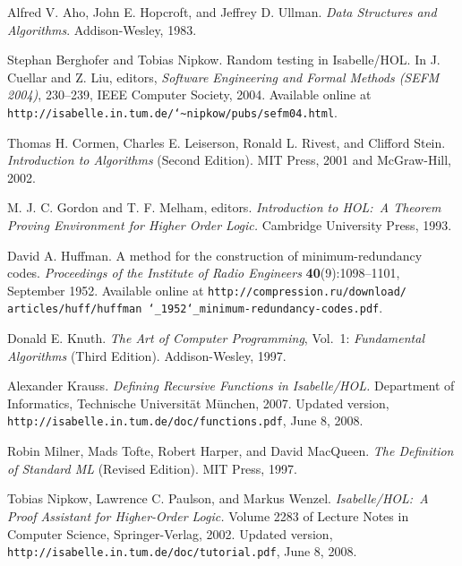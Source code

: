 \documentclass[11pt,a4paper]{article}
\begin{document}
\begin{thebibliography}{[9]}

 Alfred V. Aho, John E. Hopcroft, and Jeffrey D.
Ullman. \textsl{Data Structures and Algorithms}. Addison-Wesley, 1983.

 Stephan Berghofer and Tobias Nipkow.
Random testing in Isabelle/HOL. In J. Cuellar and Z. Liu, editors,
{\sl Software Engineering and Formal Methods (SEFM 2004)}, 230--239,
IEEE Computer Society, 2004. Available online at
{\tt http://isabelle.in.tum.de/\char`\~{}nipkow/pubs/sefm04.html}.

 Thomas H. Cormen, Charles E. Leiserson,
Ronald L. Rivest, and Clifford Stein. {\sl Introduction to Algorithms\/}
(Second Edition). MIT Press, 2001 and McGraw-Hill, 2002.

 M. J. C. Gordon and T. F. Melham, editors.
{\sl Introduction to HOL:\ A Theorem Proving Environment for Higher Order
Logic.} Cambridge University Press, 1993.

 David A. Huffman. A method for the construction of
minimum-redundancy codes. {\sl Proceedings of the Institute of Radio Engineers}
{\bf 40}(9):1098--1101, September 1952. Available online at
{\tt http://compression.ru/\allowbreak download/\allowbreak 
articles/\allowbreak huff/\allowbreak huffman\allowbreak
\char`\_{}1952\char`\_{}minimum-redundancy-codes.pdf}.

 Donald E. Knuth. {\sl The Art of Computer Programming},
Vol.~1: {\sl Fundamental Algorithms\/} (Third Edition). Addison-Wesley, 1997.

 Alexander Krauss. {\sl Defining Recursive Functions in
Isabelle/HOL.} Department of Informatics, Technische Universit\"at M\"unchen,
2007. Updated version, {\tt http://isabelle.in.tum.de/doc/functions.pdf},
June 8, 2008.

 Robin Milner, Mads Tofte, Robert Harper, and David
MacQueen. {\sl The Definition of Standard ML\/} (Revised Edition). MIT Press,
1997.

 Tobias Nipkow, Lawrence C. Paulson, and
Markus Wenzel. {\sl Is\-a\-belle/\allowbreak HOL:\ A Proof Assistant for
Higher-Order Logic.} Volume 2283 of Lecture Notes in Computer Science,
Springer-Verlag, 2002. Updated version,
{\tt http://\allowbreak isabelle.in.tum.de/doc/tutorial.pdf}, June 8, 2008.


\end{thebibliography}
\end{document}

